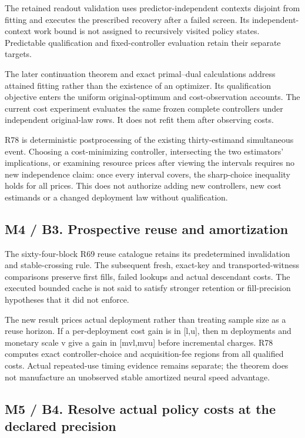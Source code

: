 \documentclass[ecta,nameyear,draft]{econsocart}
\begin{document}
The retained readout validation uses predictor-independent contexts
disjoint from fitting and executes the prescribed recovery after a
failed screen. Its independent-context work bound is not assigned to
recursively visited policy states. Predictable qualification and
fixed-controller evaluation retain their separate targets.

The later continuation theorem and exact primal--dual calculations
address attained fitting rather than the existence of an optimizer. Its
qualification objective enters the uniform original-optimum and
cost-observation accounts. The current cost experiment evaluates the
same frozen complete controllers under independent original-law rows. It
does not refit them after observing costs.

R78 is deterministic postprocessing of the existing thirty-estimand
simultaneous event. Choosing a cost-minimizing controller, intersecting
the two estimators' implications, or examining resource prices after
viewing the intervals requires no new independence claim: once every
interval covers, the sharp-choice inequality holds for all prices. This
does not authorize adding new controllers, new cost estimands or a
changed deployment law without qualification.

\hypertarget{m4-b3.-prospective-reuse-and-amortization}{%
\subsection{M4 / B3. Prospective reuse and
amortization}\label{m4-b3.-prospective-reuse-and-amortization}}

The sixty-four-block R69 reuse catalogue retains its predetermined
invalidation and stable-crossing rule. The subsequent fresh, exact-key
and transported-witness comparisons preserve first fills, failed lookups
and actual descendant costs. The executed bounded cache is not said to
satisfy stronger retention or fill-precision hypotheses that it did not
enforce.

The new result prices actual deployment rather than treating sample size
as a reuse horizon. If a per-deployment cost gain is in {[}l,u{]}, then
m deployments and monetary scale v give a gain in {[}mvl,mvu{]} before
incremental charges. R78 computes exact controller-choice and
acquisition-fee regions from all qualified costs. Actual repeated-use
timing evidence remains separate; the theorem does not manufacture an
unobserved stable amortized neural speed advantage.

\hypertarget{m5-b4.-resolve-actual-policy-costs-at-the-declared-precision}{%
\subsection{M5 / B4. Resolve actual policy costs at the declared
precision}\label{m5-b4.-resolve-actual-policy-costs-at-the-declared-precision}}
\end{document}
